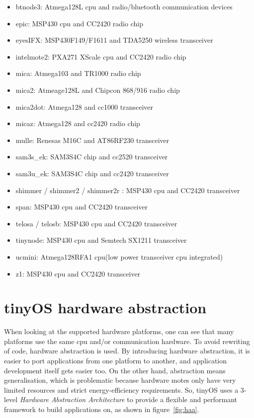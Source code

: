 \begin{itemize}
 \item btnode3: Atmega128L cpu and radio/bluetooth communication devices
 \item epic: MSP430 cpu and CC2420 radio chip
 \item eyesIFX: MSP430F149/F1611 and TDA5250 wireless transceiver
 \item intelmote2: PXA271 XScale cpu and CC2420 radio chip 
 \item mica: Atmega103 and TR1000 radio chip
 \item mica2: Atmeage128L and Chipcon 868/916 radio chip
 \item mica2dot: Atmega128 and cc1000 transceiver
 \item micaz: Atmega128 and cc2420 radio chip
 \item mulle: Renesas M16C and AT86RF230 transceiver
 \item sam3s\_ek: SAM3S4C chip and cc2520 transceiver
 \item sam3u\_ek: SAM3S4C chip and cc2420 transceiver
 \item shimmer / shimmer2 / shimmer2r : MSP430 cpu and CC2420 transceiver
 \item span: MSP430 cpu and CC2420 transceiver
 \item telosa / telosb: MSP430 cpu and CC2420 transceiver
 \item tinynode: MSP430 cpu and Semtech SX1211 transceiver
 \item ucmini: Atmega128RFA1 cpu(low power transceiver cpu integrated)
 \item z1: MSP430 cpu and CC2420 transceiver
\end{itemize}

\section{tinyOS hardware abstraction}

When looking at the supported hardware platforms, one can see that many platforms use the same cpu and/or communication hardware. To avoid rewriting of code, hardware abstraction is used.
By introducing hardware abstraction, it is easier to port applications from one platform to another, and application development itself gets easier too. On the other hand, abstraction means generalisation, which is problematic because hardware motes only have very limited resources and strict energy-efficiency requirements.
So, tinyOS uses a 3-level \textit{Hardware Abstraction Architecture} to provide a flexible and performant framework to build applications on, as shown in figure~\ref{fig:haa}.

